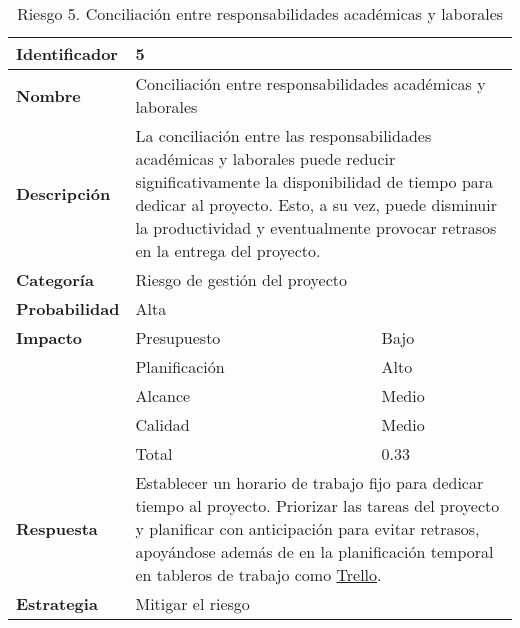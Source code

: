 \begin{table}[H]
    \centering
    \caption{Riesgo 5. Conciliación entre responsabilidades académicas y laborales}
    \label{table:risk_conciliacion}
    \begin{tabular}{>{\columncolor{rowcolor}}l l l}
    \toprule
    \rowcolor{lightgreen}
    \textbf{Identificador} & \multicolumn{2}{l}{5} \\
    \midrule
    \textbf{Nombre} & \multicolumn{2}{l}{Conciliación entre responsabilidades académicas y laborales} \\
    \midrule
    \textbf{Descripción} & \multicolumn{2}{p{10cm}}{La conciliación entre las responsabilidades académicas y laborales puede reducir significativamente la disponibilidad de tiempo para dedicar al proyecto. Esto, a su vez, puede disminuir la productividad y eventualmente provocar retrasos en la entrega del proyecto.} \\
    \midrule
    \textbf{Categoría} & \multicolumn{2}{l}{Riesgo de gestión del proyecto} \\
    \midrule
    \textbf{Probabilidad} & \multicolumn{2}{l}{Alta} \\
    \midrule
    \textbf{Impacto} & Presupuesto & Bajo \\
    \cmidrule(lr){2-3}
    & Planificación & Alto \\
    \cmidrule(lr){2-3}
    & Alcance & Medio \\
    \cmidrule(lr){2-3}
    & Calidad & Medio \\
    \cmidrule(lr){2-3}
    & Total & 0.33 \\
    \midrule
    \textbf{Respuesta} & \multicolumn{2}{p{10cm}}{Establecer un horario de trabajo fijo para dedicar tiempo al proyecto. Priorizar las tareas del proyecto y planificar con anticipación para evitar retrasos, apoyándose además de en la planificación temporal en tableros de trabajo como \href{https://trello.com/es}{Trello}.} \\
    \midrule
    \textbf{Estrategia} & \multicolumn{2}{l}{Mitigar el riesgo} \\
    \bottomrule
    \end{tabular}
\end{table}